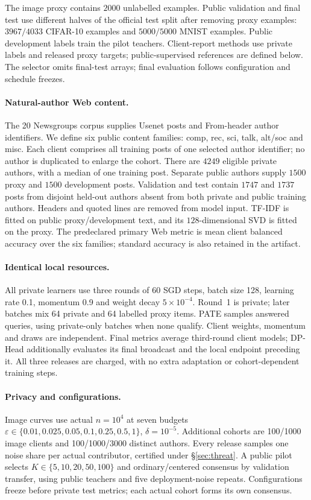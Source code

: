 The image proxy contains $2000$ unlabelled examples. Public validation and
final test use different halves of the official test split after removing
proxy examples: $3967/4033$ CIFAR-10 examples and $5000/5000$ MNIST examples.
Public development labels train the pilot teachers. Client-report methods use
private labels and released proxy targets; public-supervised references are
defined below. The selector omits final-test arrays; final evaluation follows configuration
and schedule freezes.

\paragraph{Natural-author Web content.}
The 20 Newsgroups corpus supplies Usenet posts and From-header author
identifiers. We define six public content families: comp, rec, sci, talk,
alt/soc and misc. Each client comprises all training posts of one selected
author identifier; no author is duplicated to enlarge the cohort.
There are $4249$ eligible private authors, with a median of one training post.
Separate public authors supply $1500$ proxy and $1500$ development posts.
Validation and test contain $1747$ and $1737$ posts from disjoint held-out
authors absent from both private and public training authors.
Headers and quoted lines are removed from model input.
TF-IDF is fitted on public proxy/development text, and its $128$-dimensional
SVD is fitted on the proxy. The predeclared primary Web metric is mean client
balanced accuracy over the six families; standard accuracy is also retained
in the artifact.

\paragraph{Identical local resources.}
All private learners use three rounds of 60 SGD steps, batch size 128,
learning rate 0.1, momentum 0.9 and weight decay $5\times10^{-4}$.
Round~1 is private; later batches mix 64 private and 64 labelled proxy items.
PATE samples answered queries, using private-only batches when none qualify.
Client weights, momentum and draws are independent. Final metrics average
third-round client models; DP-Head additionally evaluates its final broadcast
and the local endpoint preceding it. All three releases are charged, with no
extra adaptation or cohort-dependent training steps.

\paragraph{Privacy and configurations.}
Image curves use actual $n=10^4$ at seven budgets
$\varepsilon\in\{0.01,0.025,0.05,0.1,0.25,0.5,1\}$, $\delta=10^{-5}$.
Additional cohorts are 100/1000 image clients and 100/1000/3000 distinct authors.
Every release samples one noise share per actual contributor, certified under
\S\ref{sec:threat}. A public pilot selects $K\in\{5,10,20,50,100\}$ and
ordinary/centered consensus by validation transfer, using public teachers and
five deployment-noise repeats. Configurations freeze before private test
metrics; each actual cohort forms its own consensus.

